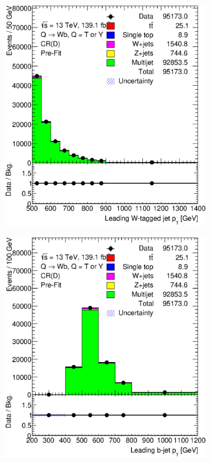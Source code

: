 \begin{figure}[hbt!]
	\centering
	\graphicspath{{figs/appendix/CRD/}}
	\begin{subfigure}{.35\textwidth}
		\centering
		\includegraphics[width=\linewidth,height=\textheight,keepaspectratio]{CR_D_ljet_pt.eps}
		\caption{}
		\label{fig:app:cr_d:ljet_pt}
	\end{subfigure}\hspace{0.6cm}
	\begin{subfigure}{.35\textwidth}
		\centering
		\includegraphics[width=\linewidth,height=\textheight,keepaspectratio]{CR_D_jet_pt.eps}

\end{subfigure}
\end{figure}
